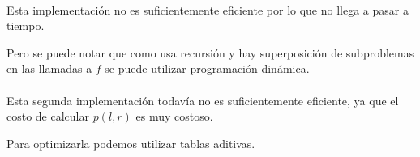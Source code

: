 \documentclass[../main.tex]{subfiles}
\begin{document}
\paragraph{} Esta implementación no es suficientemente eficiente por lo que no llega a pasar a tiempo.

Pero se puede notar que como usa recursión y hay superposición de subproblemas en las llamadas a \(f\) se puede utilizar programación dinámica.


\paragraph{} Esta segunda implementación todavía no es suficientemente eficiente, ya que el costo de calcular \(p(l, r)\) es muy costoso.

Para optimizarla podemos utilizar tablas aditivas.

\end{document}
